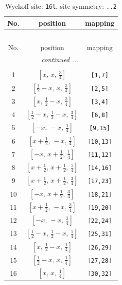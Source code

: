 \documentclass[fleqn,8pt]{jsarticle}
\begin{document}
\renewcommand{\arraystretch}{1.2}
\begin{longtable}{ccc}
\caption{Wyckoff site: {\tt 16l}, site symmetry: {\tt ..2}}
 \\
 \hline \hline
No. & position & mapping \\ \hline \endfirsthead

\multicolumn{2}{l}{\tablename\ \thetable{}} \\
 \hline \hline
No. & position & mapping \\ \hline \endhead

 \hline \hline
\multicolumn{2}{r}{\footnotesize\it continued ...} \\ \endfoot

 \hline \hline
\multicolumn{2}{r}{} \\ \endlastfoot

1 & $\left[ x,\, x,\, \frac{3}{4} \right]$ & {\tt [1,7]} \\ \hline
2 & $\left[ \frac{1}{2} - x,\, x,\, \frac{3}{4} \right]$ & {\tt [2,5]} \\ \hline
3 & $\left[ x,\, \frac{1}{2} - x,\, \frac{3}{4} \right]$ & {\tt [3,4]} \\ \hline
4 & $\left[ \frac{1}{2} - x,\, \frac{1}{2} - x,\, \frac{3}{4} \right]$ & {\tt [6,8]} \\ \hline
5 & $\left[ - x,\, - x,\, \frac{1}{4} \right]$ & {\tt [9,15]} \\ \hline
6 & $\left[ x + \frac{1}{2},\, - x,\, \frac{1}{4} \right]$ & {\tt [10,13]} \\ \hline
7 & $\left[ - x,\, x + \frac{1}{2},\, \frac{1}{4} \right]$ & {\tt [11,12]} \\ \hline
8 & $\left[ x + \frac{1}{2},\, x + \frac{1}{2},\, \frac{1}{4} \right]$ & {\tt [14,16]} \\ \hline
9 & $\left[ x + \frac{1}{2},\, x + \frac{1}{2},\, \frac{3}{4} \right]$ & {\tt [17,23]} \\ \hline
10 & $\left[ - x,\, x + \frac{1}{2},\, \frac{3}{4} \right]$ & {\tt [18,21]} \\ \hline
11 & $\left[ x + \frac{1}{2},\, - x,\, \frac{3}{4} \right]$ & {\tt [19,20]} \\ \hline
12 & $\left[ - x,\, - x,\, \frac{3}{4} \right]$ & {\tt [22,24]} \\ \hline
13 & $\left[ \frac{1}{2} - x,\, \frac{1}{2} - x,\, \frac{1}{4} \right]$ & {\tt [25,31]} \\ \hline
14 & $\left[ x,\, \frac{1}{2} - x,\, \frac{1}{4} \right]$ & {\tt [26,29]} \\ \hline
15 & $\left[ \frac{1}{2} - x,\, x,\, \frac{1}{4} \right]$ & {\tt [27,28]} \\ \hline
16 & $\left[ x,\, x,\, \frac{1}{4} \right]$ & {\tt [30,32]} \\
\end{longtable}
\end{document}
